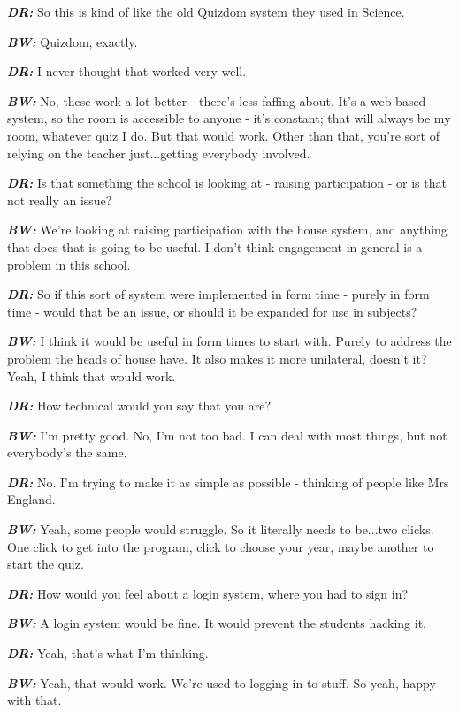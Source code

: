\textit{\textbf{DR:}} So this is kind of like the old Quizdom system they used in Science.

\textit{\textbf{BW:}} Quizdom, exactly.

\textit{\textbf{DR:}} I never thought that worked very well.

\textit{\textbf{BW:}} No, these work a lot better - there's less faffing about. It's a web based system, so the room is accessible to anyone - it's constant; that will always be my room, whatever quiz I do. But that would work. Other than that, you're sort of relying on the teacher just...getting everybody involved.

\textit{\textbf{DR:}} Is that something the school is looking at - raising participation - or is that not really an issue?

\textit{\textbf{BW:}} We're looking at raising participation with the house system, and anything that does that is going to be useful. I don't think engagement in general is a problem in this school.

\textit{\textbf{DR:}} So if this sort of system were implemented in form time - purely in form time - would that be an issue, or should it be expanded for use in subjects?

\textit{\textbf{BW:}} I think it would be useful in form times to start with. Purely to address the problem the heads of house have. It also makes it more unilateral, doesn't it? Yeah, I think that would work.

\textit{\textbf{DR:}} How technical would you say that you are?

\textit{\textbf{BW:}} I'm pretty good. No, I'm not too bad. I can deal with most things, but not everybody's the same.

\textit{\textbf{DR:}} No. I'm trying to make it as simple as possible - thinking of people like Mrs England.

\textit{\textbf{BW:}} Yeah, some people would struggle. So it literally needs to be...two clicks. One click to get into the program, click to choose your year, maybe another to start the quiz.

\textit{\textbf{DR:}} How would you feel about a login system, where you had to sign in?

\textit{\textbf{BW:}} A login system would be fine. It would prevent the students hacking it.

\textit{\textbf{DR:}} Yeah, that's what I'm thinking.

\textit{\textbf{BW:}} Yeah, that would work. We're used to logging in to stuff. So yeah, happy with that.


